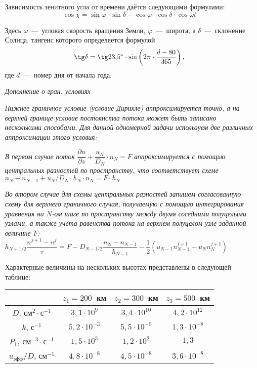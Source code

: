 \documentclass[2pt, a4paper, fleqn]{extarticle}
\begin{document}
Зависимость зенитного угла от времени даётся следующими формулами: $$\cos\chi = \sin\varphi\cdot\sin\delta-\cos\varphi\cdot\cos\delta\cdot\cos\omega t$$

Здесь $\omega$~---~угловая скорость вращения Земли, $\varphi$~---~широта, а $\delta$~---~склонение Солнца, тангенс которого определяется формулой $$\tg\delta = \tg 23{,}5^\circ \cdot \sin\left(2\pi\cdot\dfrac{d-80}{365}\right),$$ где $d$~---~номер дня от начала года.

\textit{ Дополнение о гран. условиях}

\textit{ Нижнее граничное условие (условие Дирихле) аппроксимируется точно, а на верхней границе условие постоянства потока может быть записано несколькими способами. Для данной одномерной задачи используем две различных аппроксимации этого условия:}


\textit{В первом случае поток $\dfrac{\partial n}{\partial z}+\dfrac{u_N}{D_N}\cdot n_N=F$ аппроксимируется с помощью центральных разностей по пространству, что соответствует схеме $n_N-n_{N-1}+u_N/D_N\cdot h_N\cdot n_N = F\cdot h_N$}

\textit{Во втором случае для схемы центральных разностей запишем согласованную схему для верхнего граничного случая, получаемую с помощью интегрирования уравнения на $N$-ом шаге по пространству между двумя соседними полуцелыми узлами, а также учёта равенства потока на верхнем полуцелом узле заданной величине $F$: $h_{N+1/2}\dfrac{n^{j+1}-n^j}{\tau}= F - D_{N-1/2}\dfrac{n_N-n_{N-1}}{h_{N-1}}-\dfrac{1}{2}(u_{N-1}n_{N-1}^{j+1}+u_{N}n_{N}^{j+1})$
}
 
 Характерные величины на нескольких высотах представлены в следующей таблице: 

\smallskip

\begin{tabular}{|c|c|c|c|}
\hline
&$z_1=200$~км&$z_2=300$~км&$z_3=500$~км\\
\hline
$D$, см$^{2}\cdot$с$^{-1}$&$3{,}1\cdot 10^9$&$3{,}4\cdot 10^{10}$&$4{,}2\cdot 10^{12}$\\
\hline
$k$, с$^{-1}$&$5{,}2\cdot 10^{-3}$&$5{,}5\cdot 10^{-5}$&$1{,}3\cdot 10^{-8}$\\
\hline
$P_1$, см$^{-3}\cdot$с$^{-1}$&$1{,}5\cdot 10^3$&$1{,}2\cdot 10^{2}$&$1{,}3$\\
\hline
$u_\textrm{эфф}/D$, см$^{-1}$&$4{,}8\cdot 10^{-8}$&$4{,}5\cdot 10^{-8}$&$3{,}6\cdot 10^{-8}$\\
\hline
\end{tabular}

\medskip
\end{document}
